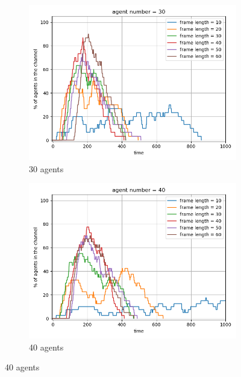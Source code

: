 \begin{figure}[htbp]
    \vspace{1cm}
    
    \begin{subfigure}[t]{0.45\linewidth}
        \centering
        \includegraphics[width=\linewidth]{figures/channel_usage_agent30.png}
        \caption{30 agents}
        \label{fig:agentpercent3}
    \end{subfigure}
    \hfill
    \begin{subfigure}[t]{0.45\linewidth}
        \centering
        \includegraphics[width=\linewidth]{figures/channel_usage_agent40.png}
        \caption{40 agents}
        \label{fig:agentpercent4}
    \end{subfigure}
    

\end{figure}
